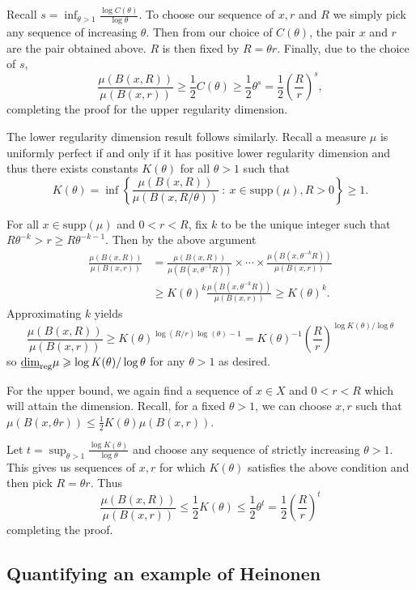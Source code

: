 Recall $s = \inf_{\theta > 1}\frac{\log C(\theta)}{\log \theta}$. To choose our sequence of $x,r$ and $R$ we simply pick any sequence of increasing $\theta$. Then from our choice of $C(\theta)$, the pair $x$ and $r$ are the pair obtained above. $R$ is then fixed by $R = \theta r$. Finally, due to the choice of $s$,
\[
\frac{\mu(B(x,R))}{\mu(B(x,r))} \ge \frac{1}{2} C(\theta)  \ge \frac{1}{2}\theta^s = \frac{1}{2}\left(\frac{R}{r} \right)^s,
\]
completing the proof for the upper regularity dimension.
	

The lower regularity dimension result follows similarly. Recall a measure $\mu$ is uniformly perfect if and only if it has positive lower regularity dimension and thus there exists constants $K(\theta)$ for all $\theta > 1$ such that 
\[
K(\theta) =  \inf \left\{ \frac{\mu(B(x,R))}{\mu(B(x,R/\theta))} \ : \ x \in \text{supp}(\mu), R>0 \right\} \geq 1.
\]

For all $x \in \text{supp}(\mu)$ and $0<r<R$, fix $k$ to be the unique integer such that $R \theta^{-k} > r \ge R \theta^{-k-1}$. Then by the above argument
\begin{align*}
\frac{\mu(B(x,R))}{\mu(B(x,r))} &= \frac{\mu(B(x,R))}{\mu(B(x,\theta^{-1}R))} \times \cdots \times \frac{\mu(B(x,\theta^{-k}R))}{\mu(B(x,r))} \\
&\ge K(\theta)^k \frac{\mu(B(x,\theta^{-k}R))}{\mu(B(x,r))} \ge K(\theta)^k.
\end{align*}
Approximating $k$ yields
\[
\frac{\mu(B(x,R))}{\mu(B(x,r))} \ge K(\theta)^{\log(R/r)\log(\theta) - 1} = K(\theta)^{-1} \left(\frac{R}{r}\right)^{\log K(\theta)/ \log \theta}
\]
so $\underline{\dim}_{\textup{reg}} \mu \geqslant \log K(\theta) / \log \theta$ for any $\theta > 1$ as desired. 

For the upper bound, we again find a sequence of $x\in X$ and $0<r<R$ which will attain the dimension. Recall, for a fixed $\theta > 1$, we can choose $x,r$ such that $\mu(B(x,\theta r)) \le \frac{1}{2}K(\theta)\mu(B(x,r))$. 

Let $t = \sup_{\theta > 1} \frac{\log K(\theta)}{\log \theta}$ and choose any sequence of strictly increasing $\theta > 1$. This gives us sequences of $x,r$ for which $K(\theta)$ satisfies the above condition and then pick $R = \theta r$. Thus
\[
\frac{\mu(B(x,R))}{\mu(B(x,r))} \le \frac{1}{2} K(\theta) \le \frac{1}{2} \theta^t = \frac{1}{2} \left(\frac{R}{r} \right)^t
\]
completing the proof.



\subsection{Quantifying an example of Heinonen}\label{ch-quantifying:sec:proof-heinonen}



